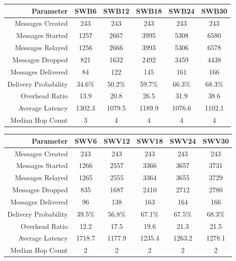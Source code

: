 \documentclass{article}
\begin{document}
\begin{center}
\begin{tabular}{|r|c|c|c|c|c|}
\hline
\textbf{Parameter} & \textbf{SWB6} & \textbf{SWB12} & \textbf{SWB18} & \textbf{SWB24} & \textbf{SWB30} \\ \hline
Messages Created & 243 & 243 & 243 & 243 & 243 \\ \hline
Messages Started & 1257 & 2667 & 3995 & 5308 & 6580 \\ \hline
Messages Relayed & 1256 & 2666 & 3993 & 5306 & 6578 \\ \hline
Messages Dropped & 821 & 1632 & 2492 & 3459 & 4438 \\ \hline
Messages Delivered & 84 & 122 & 145 & 161 & 166 \\ \hline
Delivery Probability & 34.6\% & 50.2\% & 59.7\% & 66.3\% & 68.3\% \\ \hline
Overhead Ratio & 13.9 & 20.8 & 26.5 & 31.9 & 38.6 \\ \hline
Average Latency & 1302.3 & 1079.5 & 1189.9 & 1076.6 & 1102.1 \\ \hline
Median Hop Count & 3 & 4 & 4 & 4 & 4\\ \hline
\end{tabular}
\end{center}

\begin{center}
\begin{tabular}{|r|c|c|c|c|c|}
\hline
\textbf{Parameter} & \textbf{SWV6} & \textbf{SWV12} & \textbf{SWV18} & \textbf{SWV24} & \textbf{SWV30} \\ \hline
Messages Created & 243 & 243 & 243 & 243 & 243 \\ \hline
Messages Started & 1266 & 2557 & 3366 & 3657 & 3731 \\ \hline
Messages Relayed & 1265 & 2555 & 3364 & 3655 & 3729 \\ \hline
Messages Dropped & 835 & 1687 & 2410 & 2712 & 2780 \\ \hline
Messages Delivered & 96 & 138 & 163 & 164 & 166 \\ \hline
Delivery Probability & 39.5\% & 56.8\% & 67.1\% & 67.5\% & 68.3\%\\ \hline
Overhead Ratio & 12.2 & 17.5 & 19.6 & 21.3 & 21.5 \\ \hline
Average Latency & 1718.7 & 1177.9 & 1235.4 & 1263.2 & 1278.1 \\ \hline
Median Hop Count & 2 & 2 & 2 & 2 & 2\\ \hline
\end{tabular}
\end{center}
\end{document}
